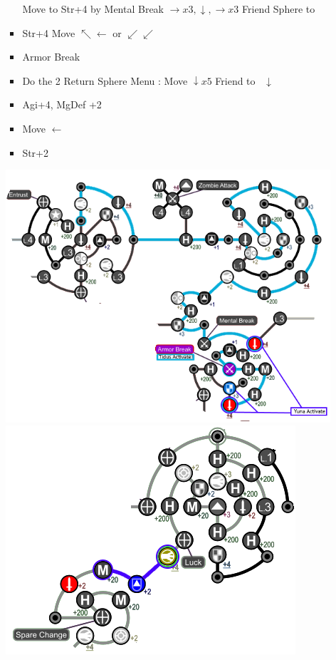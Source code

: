 \begin{spheregrid}
\begin{multicols}{2}
\begin{itemize}
\begin{itemize}
				      \begin{itemize}
					      \tidusf Move to Str+4 by Mental Break $\rightarrow x3, \downarrow, \rightarrow x3$
					      \yunaf Friend Sphere to \tidus
					      \item Str+4
					            \tidusf Move $\nwarrow\leftarrow$ or $\swarrow\swarrow$
					      \item Armor Break
					      \item Do the 2 Return Sphere Menu
					            \rikkuf: Move $\downarrow x5$
					            \yunaf Friend to \rikku\ $\downarrow$
					      \item Agi+4, MgDef +2
					      \item Move $\leftarrow$
					      \item Str+2
				      \end{itemize}
				      \includegraphics[width=.9\columnwidth]{graphics/0_returns}
				      \includegraphics[width=.7\columnwidth]{graphics/0_returns_pt2}
			\end{itemize}

\end{itemize}
\end{multicols}
\end{spheregrid}
